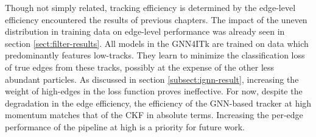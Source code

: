 Though not simply related, tracking efficiency is determined by the edge-level efficiency encountered the results of previous chapters.
The impact of the uneven \pT distribution in training data on edge-level performance was already seen in section \ref{sect:filter-results}. 
All models in the GNN4ITk are trained on data which predominantly features low-\pT tracks. 
They learn to minimize the classification loss of true edges from these tracks, possibly at the expense of the other less abundant particles.
As discussed in section \ref{subsect:ignn-result}, increasing the weight of high-\pT edges in the loss function proves ineffective.
For now, despite the degradation in the edge efficiency, the efficiency of the GNN-based tracker at high momentum matches that of the CKF in absolute terms. 
Increasing the per-edge performance of the pipeline at high \pT is a priority for future work.



